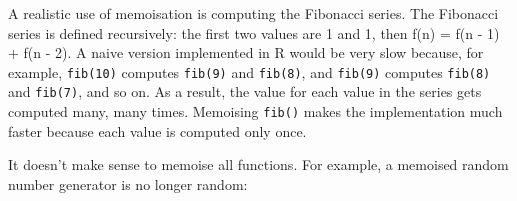 A realistic use of memoisation is computing the Fibonacci series. The
Fibonacci series is defined recursively: the first two values are 1 and
1, then f(n) = f(n - 1) + f(n - 2). A naive version implemented in R
would be very slow because, for example, \texttt{fib(10)} computes
\texttt{fib(9)} and \texttt{fib(8)}, and \texttt{fib(9)} computes
\texttt{fib(8)} and \texttt{fib(7)}, and so on. As a result, the value
for each value in the series gets computed many, many times. Memoising
\texttt{fib()} makes the implementation much faster because each value
is computed only once. 

\begin{Shaded}
\begin{Highlighting}[]
\StringTok{ }
  \StringTok{ }\NormalTok{) }\NormalTok{(}\NormalTok{)}
  \StringTok{ }\NormalTok{) +}\StringTok{ }\StringTok{ }\NormalTok{)}
\NormalTok{\}}
\NormalTok{(}\NormalTok{(}\NormalTok{))}
\NormalTok{(}\NormalTok{(}\NormalTok{))}

\StringTok{ }
  \StringTok{ }\NormalTok{) }\NormalTok{(}\NormalTok{)}
  \StringTok{ }\NormalTok{) +}\StringTok{ }\StringTok{ }\NormalTok{)}
\NormalTok{\})}
\NormalTok{(}\NormalTok{(}\NormalTok{))}
\NormalTok{(}\NormalTok{(}\NormalTok{))}
\end{Highlighting}
\end{Shaded}

It doesn't make sense to memoise all functions. For example, a memoised
random number generator is no longer random:

\begin{Shaded}
\begin{Highlighting}[]
\StringTok{ }
\NormalTok{(}\NormalTok{)}
\NormalTok{(}\NormalTok{)}
\end{Highlighting}
\end{Shaded}

